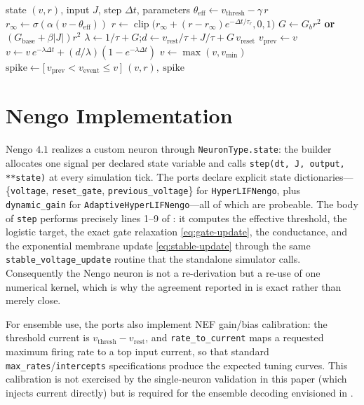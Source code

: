 \documentclass[11pt]{article}
\newcommand{\vth}{v_{\mathrm{thresh}}}
\newcommand{\vr}{v_{\mathrm{rest}}}
\newcommand{\vre}{v_{\mathrm{reset}}}
\newcommand{\vmin}{v_{\min}}
\newcommand{\teff}{\theta_{\mathrm{eff}}}
\newcommand{\rinf}{r_{\infty}}
\newcommand{\Gb}{G_{b}}
\newcommand{\Gbase}{G_{\mathrm{base}}}
\newcommand{\code}[1]{\texttt{#1}}
\begin{document}
\begin{algorithm}[t]
\caption{HyperLIF / Adaptive HyperLIF discrete update (one step).}
\label{alg:step}
\begin{algorithmic}[1]
\Require state $(v,r)$, input $J$, step $\Delta t$, parameters
\State $\teff \gets \vth - \gamma\,r$ 
\State $\rinf \gets \sigma(\alpha(v-\teff))$ 
\State $r \gets \operatorname{clip}\!\big(\rinf + (r-\rinf)e^{-\Delta t/\tau_r},0,1\big)$
\State $G \gets \Gb r^2$ \; \textbf{or} \; $(\Gbase+\beta|J|)r^2$ 
\State $\lambda \gets 1/\tau + G$;\quad $d \gets \vr/\tau + J/\tau + G\,\vre$
\State $v_{\mathrm{prev}} \gets v$
\State $v \gets v\,e^{-\lambda\Delta t} + (d/\lambda)(1-e^{-\lambda\Delta t})$
\State $v \gets \max(v, \vmin)$
\State $\mathrm{spike} \gets \big[\,v_{\mathrm{prev}} < v_{\mathrm{event}} \le v\,\big]$
\State \Return $(v,r),\ \mathrm{spike}$
\end{algorithmic}
\end{algorithm}

\section{Nengo Implementation}\label{sec:nengo}
Nengo $4.1$ realizes a custom neuron through \code{NeuronType.state}: the builder
allocates one signal per declared state variable and calls
\code{step(dt, J, output, **state)} at every simulation tick. The ports declare
explicit state dictionaries---\{\code{voltage}, \code{reset\_gate},
\code{previous\_voltage}\} for \code{HyperLIFNengo}, plus \code{dynamic\_gain}
for \code{AdaptiveHyperLIFNengo}---all of which are probeable. The body of
\code{step} performs precisely lines 1--9 of : it computes the
effective threshold, the logistic target, the exact gate relaxation
\cref{eq:gate-update}, the conductance, and the exponential membrane update
\cref{eq:stable-update} through the same \code{stable\_voltage\_update} routine
that the standalone simulator calls. Consequently the Nengo neuron is not a
re-derivation but a re-use of one numerical kernel, which is why the agreement
reported in  is exact rather than merely close.

For ensemble use, the ports also implement NEF gain/bias calibration: the
threshold current is $\vth-\vr$, and \code{rate\_to\_current} maps a requested
maximum firing rate to a top input current, so that standard
\code{max\_rates}/\code{intercepts} specifications produce the expected tuning
curves. This calibration is not exercised by the single-neuron validation in
this paper (which injects current directly) but is required for the ensemble
decoding envisioned in .
\end{document}
